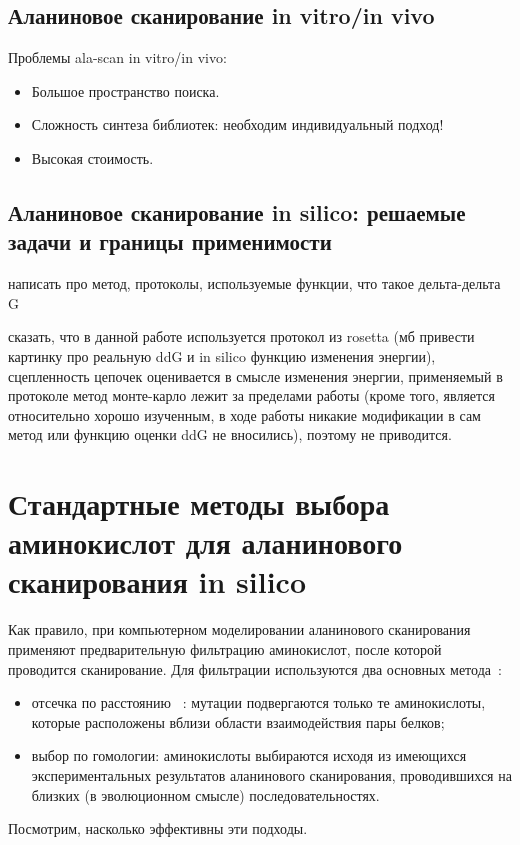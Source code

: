 \subsection{Аланиновое сканирование in vitro/in vivo}
Проблемы ala-scan in vitro/in vivo:
\begin{itemize}
\item Большое пространство поиска.
\item Сложность синтеза библиотек: необходим индивидуальный подход!
\item Высокая стоимость.
\end{itemize}
\subsection{Аланиновое сканирование in silico: решаемые задачи и границы применимости}
написать про метод, протоколы, используемые функции, что такое дельта-дельта G

сказать, что в данной работе используется протокол из rosetta (мб привести картинку про реальную ddG и in silico функцию изменения энергии), сцепленность цепочек оценивается в смысле изменения энергии, применяемый в протоколе метод монте-карло лежит за пределами работы (кроме того, является относительно хорошо изученным, в ходе работы никакие модификации в сам метод или функцию оценки ddG не вносились), поэтому не приводится. 
\section{Стандартные методы выбора аминокислот для аланинового сканирования in silico}

Как правило, при компьютерном моделировании аланинового сканирования применяют предварительную фильтрацию аминокислот, после которой проводится сканирование. Для фильтрации используются два основных метода~\cite{hotspots2012rev}:
\begin{itemize}
\item отсечка по расстоянию ~\cite{kortemme2004}: мутации подвергаются только те аминокислоты, которые расположены вблизи области взаимодействия пары белков;

\item выбор по гомологии: аминокислоты выбираются исходя из имеющихся экспериментальных результатов аланинового сканирования, проводившихся на близких (в эволюционном смысле) последовательностях.
\end{itemize}

Посмотрим, насколько эффективны эти подходы.

